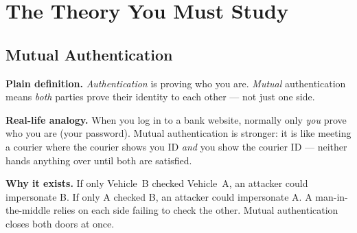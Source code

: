 \documentclass[11pt,a4paper]{report}
\begin{document}
\begin{center}
\end{center}

\section{The Theory You Must Study}

\subsection{Mutual Authentication}
\textbf{Plain definition.} \emph{Authentication} is proving who you are.
\emph{Mutual} authentication means \emph{both} parties prove their identity to
each other --- not just one side.

\textbf{Real-life analogy.} When you log in to a bank website, normally only
\emph{you} prove who you are (your password). Mutual authentication is stronger:
it is like meeting a courier where the courier shows you ID \emph{and} you show
the courier ID --- neither hands anything over until both are satisfied.

\textbf{Why it exists.} If only Vehicle~B checked Vehicle~A, an attacker could
impersonate B. If only A checked B, an attacker could impersonate A. A
man-in-the-middle relies on each side failing to check the other. Mutual
authentication closes both doors at once.
\end{document}
